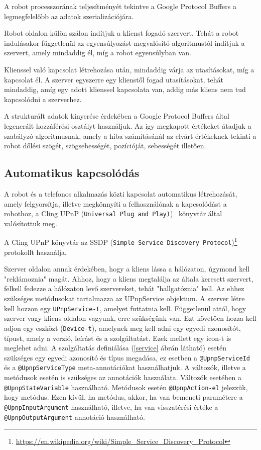 A robot processzorának teljesítményét tekintve a Google Protocol Buffers a legmegfelelőbb az adatok szerializációjára.

Robot oldalon külön szálon indítjuk a klienst fogadó szervert. Tehát a robot indulásakor függetlenül az egyensúlyozást megvalósító algoritmustól indítjuk a szervert, amely mindaddig él, míg a robot egyensúlyban van.

Klienssel való kapcsolat létrehozása után, mindaddig várja az utasításokat, míg a kapcsolat él. A szerver egyszerre egy klienstől fogad utasításokat, tehát mindaddig, amíg egy adott klienssel kapcsolata van, addig más kliens nem tud kapcsolódni a szerverhez.

A strukturált adatok kinyerése érdekében a Google Protocol Buffers által legenerált hozzáférési osztályt használjuk. Az így megkapott értékeket átadjuk a szabályzó algoritmusnak, amely a hiba számításánál az elvárt értékeknek tekinti a robot dőlési szögét, szögsebességét, pozícióját, sebességét illetően.

\subsection{Automatikus kapcsolódás}

A robot és a telefonos alkalmazás közti kapcsolat automatikus létrehozását, amely felgyorsítja, illetve megkönnyíti a felhasználónak a kapcsolódást a robothoz, a Cling UPnP (\texttt{Universal Plug and Play)})~\cite{upnp} könyvtár által valósítottuk meg.

A Cling UPnP könyvtár az SSDP (\texttt{Simple Service Discovery Protocol})\footnote{\href{https://en.wikipedia.org/wiki/Simple\_Service\_Discovery\_Protocol}{https://en.wikipedia.org/wiki/Simple\_Service\_Discovery\_Protocol}} protokollt használja.

Szerver oldalon annak érdekében, hogy a kliens lássa a hálózaton, úgymond kell "reklámoznia" magát. Ahhoz, hogy a kliens megtalálja az általa keresett szervert, felkell fedezze a hálózaton levő szervereket, tehát "hallgatóznia" kell. Az ehhez szükséges metódusokat tartalmazza az UPnpService objektum. A szerver létre kell hozzon egy \texttt{UPnpService-t}, amelyet futtatnia kell. Függetlenül attól, hogy szerver vagy kliens oldalon vagyunk, erre szükségünk van. Ezt követően hozza kell adjon egy eszközt (\texttt{Device-t}), amelynek meg kell adni egy egyedi azonosítót, típust, amely a verzió, leírást és a szolgáltatást. Ezek mellett egy icon-t is meglehet adni. A szolgáltatás definiálása (\ref{service} ábrán látható) esetén szükséges egy egyedi azonosító és típus megadása, ez esetben a \texttt{@UpnpServiceId} és a \texttt{@UpnpServiceType} meta-annotációkat használhatjuk. A változók, illetve a metódusok esetén is szükséges az annotációk használata. Változók esetében a \texttt{@UpnpStateVariable} használható. Metódusok esetén \texttt{@UpnpAction-el} jelezzük, hogy metódus. Ezen kívül, ha metódus, akkor, ha van bemeneti paramétere a \texttt{@UpnpInputArgument} használható, illetve, ha van visszatérési értéke a \texttt{@UpnpOutputArgument} annotáció használható.

